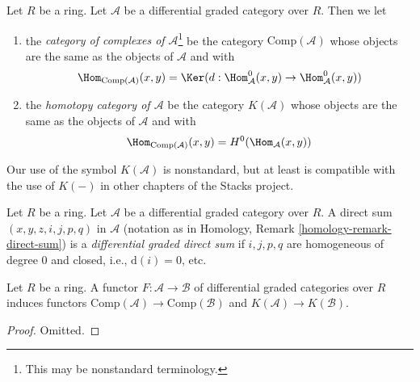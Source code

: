 \begin{definition}
\label{definition-homotopy-category-of-dga-category}
Let $R$ be a ring. Let $\mathcal{A}$ be a differential graded category
over $R$. Then we let
\begin{enumerate}
\item the {\it category of complexes of $\mathcal{A}$}\footnote{This may
be nonstandard terminology.} be the category
$\text{Comp}(\mathcal{A})$ whose objects are the same as the objects
of $\mathcal{A}$ and with
$$
\Hom_{\text{Comp}(\mathcal{A})}(x, y) =
\Ker(d : \Hom^0_\mathcal{A}(x, y) \to \Hom^0_\mathcal{A}(x, y))
$$
\item the {\it homotopy category of $\mathcal{A}$} be the category
$K(\mathcal{A})$ whose objects are the same as the objects
of $\mathcal{A}$ and with
$$
\Hom_{\text{Comp}(\mathcal{A})}(x, y) = H^0(\Hom_\mathcal{A}(x, y))
$$
\end{enumerate}
\end{definition}

\noindent
Our use of the symbol $K(\mathcal{A})$ is nonstandard, but at least
is compatible with the use of $K(-)$ in other chapters of the Stacks project.

\begin{definition}
\label{definition-dg-direct-sum}
Let $R$ be a ring. Let $\mathcal{A}$ be a differential graded category over
$R$. A direct sum $(x, y, z, i, j, p, q)$ in $\mathcal{A}$ (notation as in
Homology, Remark \ref{homology-remark-direct-sum})
is a {\it differential graded direct sum} if $i, j, p, q$ are homogeneous
of degree $0$ and closed, i.e., $\text{d}(i) = 0$, etc.
\end{definition}

\begin{lemma}
\label{lemma-functorial}
Let $R$ be a ring. A functor
$F : \mathcal{A} \to \mathcal{B}$
of differential graded categories over $R$
induces functors $\text{Comp}(\mathcal{A}) \to \text{Comp}(\mathcal{B})$
and $K(\mathcal{A}) \to K(\mathcal{B})$.
\end{lemma}

\begin{proof}
Omitted.
\end{proof}

